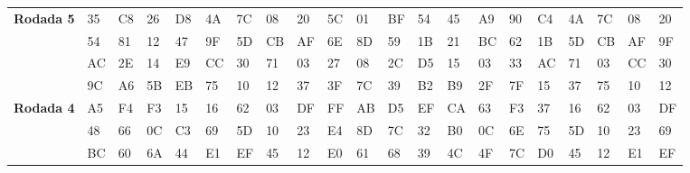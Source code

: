 \documentclass[
    article,            %
    11pt,               %
    oneside,            %
    a4paper,            %
    english,            %
    brazil,             %
    sumario=tradicional,
    ]{abntex2}
\begin{document}
\begin{table}[H]
{\begin{tabular}{|
>{\columncolor[HTML]{C0C0C0}}l |llll|llll|llll|llll|llll|}
\textbf{Rodada 5}  & 35              & C8              & 26              & D8              & 4A             & 7C             & 08            & 20            & 5C             & 01            & BF            & 54            & 45              & A9             & 90             & C4             & 4A             & 7C             & 08             & 20            \\
\textbf{}          & 54              & 81              & 12              & 47              & 9F             & 5D             & CB            & AF            & 6E             & 8D            & 59            & 1B            & 21              & BC             & 62             & 1B             & 5D             & CB             & AF             & 9F            \\
\textbf{}          & AC              & 2E              & 14              & E9              & CC             & 30             & 71            & 03            & 27             & 08            & 2C            & D5            & 15              & 03             & 33             & AC             & 71             & 03             & CC             & 30            \\
\textbf{}          & 9C              & A6              & 5B              & EB              & 75             & 10             & 12            & 37            & 3F             & 7C            & 39            & B2            & B9              & 2F             & 7F             & 15             & 37             & 75             & 10             & 12            \\ \hline
\textbf{Rodada 4}  & A5              & F4              & F3              & 15              & 16             & 62             & 03            & DF            & FF             & AB            & D5            & EF            & CA              & 63             & F3             & 37             & 16             & 62             & 03             & DF            \\
\textbf{}          & 48              & 66              & 0C              & C3              & 69             & 5D             & 10            & 23            & E4             & 8D            & 7C            & 32            & B0              & 0C             & 6E             & 75             & 5D             & 10             & 23             & 69            \\
\textbf{}          & BC              & 60              & 6A              & 44              & E1             & EF             & 45            & 12            & E0             & 61            & 68            & 39            & 4C              & 4F             & 7C             & D0             & 45             & 12             & E1             & EF            \\

\end{tabular}}
\end{table}
\end{document}
